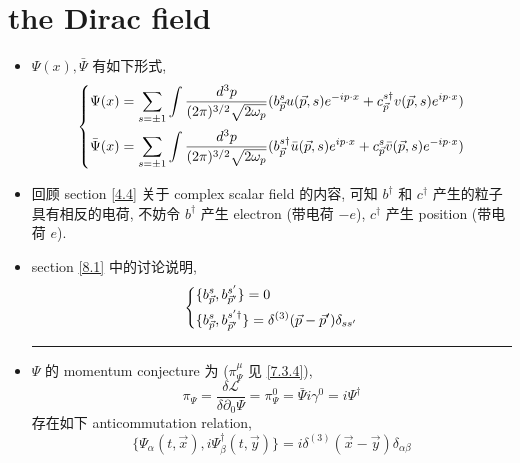 \section{the Dirac field}
\begin{itemize}
	\item $\Psi(x), \bar{\Psi}$ 有如下形式,
	\begin{equation}
		\begin{dcases}
			\Psi(x) = \sum_{s = \pm 1} \int \frac{d^3 p}{(2 \pi)^{3 / 2} \sqrt{2 \omega_p}} (b^s_{\vec{p}} u(\vec{p}, s) e^{- i p \cdot x} + c^{s \dag}_{\vec{p}} v(\vec{p}, s) e^{i p \cdot x}) \\
			\bar{\Psi}(x) = \sum_{s = \pm 1} \int \frac{d^3 p}{(2 \pi)^{3 / 2} \sqrt{2 \omega_p}} (b^{s \dag}_{\vec{p}} \bar{u}(\vec{p}, s) e^{i p \cdot x} + c^s_{\vec{p}} \bar{v}(\vec{p}, s) e^{- i p \cdot x})
		\end{dcases}
	\end{equation}
	
	\item 回顾 section \ref{4.4} 关于 complex scalar field 的内容, 可知 $b^\dag$ 和 $c^\dag$ 产生的粒子具有相反的电荷, 不妨令 $b^\dag$ 产生 electron (带电荷 $- e$), $c^\dag$ 产生 position (带电荷 $e$).
	
	\item section \ref{8.1} 中的讨论说明,
	\begin{equation} \label{8.3.2}
		\begin{dcases}
			\{b^s_{\vec{p}}, b^{s'}_{\vec{p}'}\} = 0 \\
			\{b^s_{\vec{p}}, b^{s' \dag}_{\vec{p}'}\} = \delta^{(3)}(\vec{p} - \vec{p}') \delta_{s s'}
		\end{dcases}
	\end{equation}
	
	\noindent\rule[0.5ex]{\linewidth}{0.5pt} %
	
	\item $\Psi$ 的 momentum conjecture 为 ($\pi_\Psi^\mu$ 见 \eqref{7.3.4}),
	\begin{equation}
		\pi_\Psi = \frac{\delta \mathcal{L}}{\delta \partial_0 \Psi} = \pi_\Psi^0 = \bar{\Psi} i \gamma^0 = i \Psi^\dag
	\end{equation}
	存在如下 anticommutation relation,
	\begin{equation}
		\{\Psi_\alpha(t, \vec{x}), i \Psi^\dag_\beta(t, \vec{y})\} = i \delta^{(3)}(\vec{x} - \vec{y}) \delta_{\alpha \beta}
	\end{equation}
	

\end{itemize}
